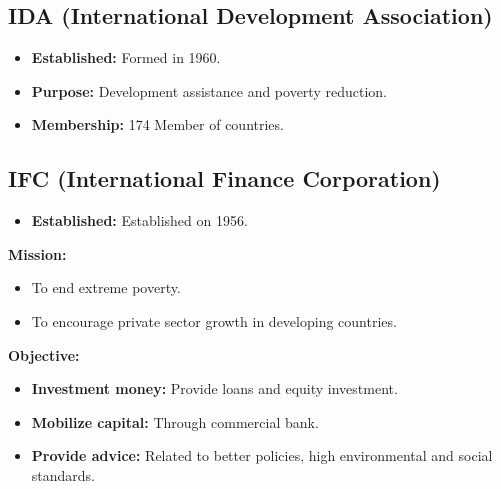 \subsection{IDA (International Development Association)}
\begin{formulabox}
\begin{itemize}[leftmargin=*, noitemsep]
    \item \textbf{Established:} Formed in 1960.
    \item \textbf{Purpose:} Development assistance and poverty reduction.
    \item \textbf{Membership:} 174 Member of countries.
\end{itemize}
\end{formulabox}

\subsection{IFC (International Finance Corporation)}
\begin{formulabox}
\begin{itemize}[leftmargin=*, noitemsep]
    \item \textbf{Established:} Established on 1956.
\end{itemize}
\end{formulabox}

\noindent\textbf{Mission:}
\begin{itemize}[leftmargin=*]
    \item To end extreme poverty.
    \item To encourage private sector growth in developing countries.
\end{itemize}

\noindent\textbf{Objective:}
\begin{itemize}[leftmargin=*]
    \item \textbf{Investment money:} Provide loans and equity investment.
    \item \textbf{Mobilize capital:} Through commercial bank.
    \item \textbf{Provide advice:} Related to better policies, high environmental and social standards.
\end{itemize}

